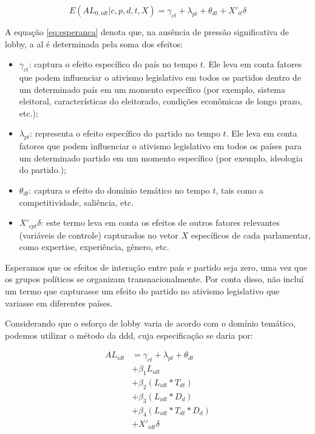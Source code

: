 \begin{equation}
    \label{eq:esperanca}
    E(AL_{0,idt} \vert c,p,d,t,X) = \gamma_{ct} + \lambda_{pt} + \theta_{dt} + X'_{it} \delta
\end{equation}

A equação \ref{eq:esperanca} denota que, na ausência de pressão significativa de lobby, a \acrshort{al} é determinada pela soma dos efeitos:
\begin{itemize}
    \item $\gamma_{ct}$: captura o efeito específico do país no tempo $t$. Ele leva em conta fatores que podem influenciar o ativismo legislativo em todos os partidos dentro de um determinado país em um momento específico (por exemplo, sistema eleitoral, características do eleitorado, condições econômicas de longo prazo, etc.);
    \item $\lambda_{pt}$: representa o efeito específico do partido no tempo $t$. Ele leva em conta fatores que podem influenciar o ativismo legislativo em todos os países para um determinado partido em um momento específico (por exemplo, ideologia do partido.);
    \item $\theta_{dt}$: captura o efeito do domínio temático no tempo $t$, tais como a competitividade, saliência, etc.
    \item $X'_{cpt} \delta$: este termo leva em conta os efeitos de outros fatores relevantes (variáveis de controle) capturados no vetor $X$ específicos de cada parlamentar, como expertise, experiência, gênero, etc.
\end{itemize}

Esperamos que os efeitos de interação entre país e partido seja zero, uma vez que os grupos políticos se organizam transnacionalmente. Por conta disso, não incluí um termo que capturasse um efeito do partido no ativismo legislativo que variasse em diferentes países. 

Considerando que o esforço de lobby varia de acordo com o domínio temático, podemos utilizar o método da \acrfull{ddd}, cuja especificação se daria por:

\begin{equation}
    \begin{split}
        AL_{idt} &= \gamma_{ct} + \lambda_{pt} + \theta_{dt}\\
        &+ \beta_1 L_{idt}\\
        &+ \beta_2 (L_{idt} * T_{dt})\\
        &+ \beta_3 (L_{idt} * D_d)\\
        &+ \beta_4 (L_{idt} * T_{dt} * D_d)\\
        &+ X'_{idt} \delta
    \end{split}
\end{equation}

